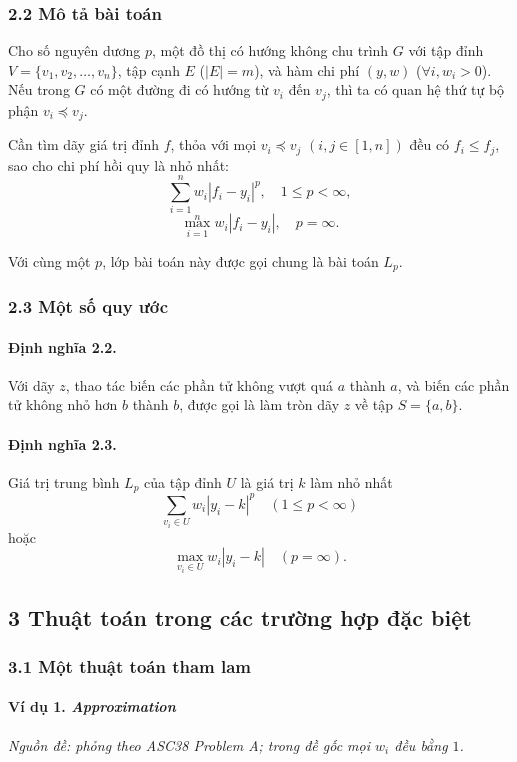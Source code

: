 \documentclass[11pt]{article}
\begin{document}
\subsubsection*{2.2 Mô tả bài toán}

Cho số nguyên dương \(p\), một đồ thị có hướng không chu trình \(G\) với tập đỉnh
\(V=\{v_1,v_2,\ldots,v_n\}\), tập cạnh \(E\) (\(|E|=m\)), và hàm chi phí
\((y,w)\) (\(\forall i,w_i>0\)). Nếu trong \(G\) có một đường đi có hướng từ
\(v_i\) đến \(v_j\), thì ta có quan hệ thứ tự bộ phận \(v_i\preceq v_j\).

Cần tìm dãy giá trị đỉnh \(f\), thỏa với mọi \(v_i\preceq v_j\)
\((i,j\in[1,n])\) đều có \(f_i\le f_j\), sao cho chi phí hồi quy là nhỏ nhất:
\[
  \sum_{i=1}^{n} w_i |f_i-y_i|^p,\quad 1\le p<\infty,
\]
\[
  \max_{i=1}^{n} w_i |f_i-y_i|,\quad p=\infty.
\]

Với cùng một \(p\), lớp bài toán này được gọi chung là bài toán \(L_p\).

\subsubsection*{2.3 Một số quy ước}

\paragraph{Định nghĩa 2.2.}
Với dãy \(z\), thao tác biến các phần tử không vượt quá \(a\) thành \(a\), và
biến các phần tử không nhỏ hơn \(b\) thành \(b\), được gọi là làm tròn dãy \(z\)
về tập \(S=\{a,b\}\).

\paragraph{Định nghĩa 2.3.}
Giá trị trung bình \(L_p\) của tập đỉnh \(U\) là giá trị \(k\) làm nhỏ nhất
\[
  \sum_{v_i\in U} w_i |y_i-k|^p\quad (1\le p<\infty)
\]
hoặc
\[
  \max_{v_i\in U} w_i |y_i-k|\quad (p=\infty).
\]

\subsection*{3 Thuật toán trong các trường hợp đặc biệt}

\subsubsection*{3.1 Một thuật toán tham lam}

\paragraph{Ví dụ 1. \emph{Approximation}}
\noindent\emph{Nguồn đề: phỏng theo ASC38 Problem A; trong đề gốc mọi \(w_i\)
đều bằng \(1\).}
\end{document}
